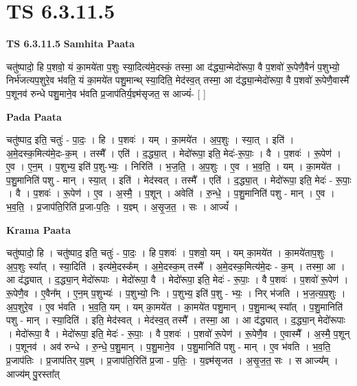 \documentclass[17pt]{extarticle}
\begin{document}
\section{ TS 6.3.11.5 }

\textbf{TS 6.3.11.5 } \newline
\textbf{Samhita Paata} \newline

चतु॑ष्पादो॒ हि प॒शवो॒ यं का॒मये॑ता प॒शुः स्या॒दित्य॑मे॒दस्कं॒ तस्मा॒ आ द॑द्ध्या॒न्मेदो॑रूपा॒ वै प॒शवो॑ रू॒पेणै॒वैनं॑ प॒शुभ्यो॒ निर्भ॑जत्यप॒शुरे॒व भ॑वति॒ यं का॒मये॑त पशु॒मान्थ् स्या॒दिति॒ मेद॑स्व॒त् तस्मा॒ आ द॑द्ध्या॒न्मेदो॑रूपा॒ वै प॒शवो॑ रू॒पेणै॒वास्मै॑ प॒शूनव॑ रुन्धे पशु॒माने॒व भ॑वति प्र॒जाप॑तिर्य॒ज्ञ्म॑सृजत॒ स आज्यं॑- [  ] \newline

\textbf{Pada Paata} \newline

चतु॑ष्पाद॒ इति॒ चतुः॑ - पा॒दः॒ । हि । प॒शवः॑ । यम् । का॒मये॑त । अ॒प॒शुः । स्या॒त् । इति॑ । अ॒मे॒दस्क॒मित्य॑मे॒दः-क॒म् । तस्मै᳚ । एति॑ । द॒द्ध्या॒त् । मेदो॑रूपा॒ इति॒ मेदः॑-रू॒पाः॒ । वै । प॒शवः॑ । रू॒पेण॑ । ए॒व । ए॒न॒म् । प॒शुभ्य॒ इति॑ प॒शु-भ्यः॒ । निरिति॑ । भ॒ज॒ति॒ । अ॒प॒शुः । ए॒व । भ॒व॒ति॒ । यम् । का॒मये॑त । प॒शु॒मानिति॑ पशु - मान् । स्या॒त् । इति॑ । मेद॑स्वत् । तस्मै᳚ । एति॑ । द॒द्ध्या॒त् । मेदो॑रूपा॒ इति॒ मेदः॑ - रू॒पाः॒ । वै । प॒शवः॑ । रू॒पेण॑ । ए॒व । अ॒स्मै॒ । प॒शून् । अवेति॑ । रु॒न्धे॒ । प॒शु॒मानिति॑ पशु - मान् । ए॒व । भ॒व॒ति॒ । प्र॒जाप॑ति॒रिति॑ प्र॒जा-प॒तिः॒ । य॒ज्ञ्म् । अ॒सृ॒ज॒त॒ । सः । आज्यं᳚ ।  \newline


\textbf{Krama Paata} \newline

चतु॑ष्पादो॒ हि । चतु॑ष्पाद॒ इति॒ चतुः॑ - पा॒दः॒ । हि प॒शवः॑ । प॒शवो॒ यम् । यम् का॒मये॑त । 
का॒मये॑ताप॒शुः । अ॒प॒शुः स्या᳚त् । स्या॒दिति॑ । इत्य॑मे॒दस्क᳚म् । अ॒मे॒दस्क॒म् तस्मै᳚ । अ॒मे॒दस्क॒मित्य॑मे॒दः - क॒म् । तस्मा॒ आ । आ द॑द्ध्यात् । द॒द्ध्या॒न् मेदो॑रूपाः । मेदो॑रूपा॒ वै । मेदो॑रूपा॒ इति॒ मेदः॑ - रू॒पाः॒ । वै प॒शवः॑ । प॒शवो॑ रू॒पेण॑ । रू॒पेणै॒व । ए॒वैन᳚म् । ए॒न॒म् प॒शुभ्यः॑ । प॒शुभ्यो॒ निः । प॒शुभ्य॒ इति॑ प॒शु - भ्यः॒ । निर् भ॑जति । भ॒ज॒त्य॒प॒शुः । अ॒प॒शुरे॒व । ए॒व भ॑वति । भ॒व॒ति॒ यम् । यम् का॒मये॑त । का॒मये॑त पशु॒मान् । प॒शु॒मान्थ् स्या᳚त् । प॒शु॒मानिति॑ पशु - मान् । स्या॒दिति॑ । इति॒ मेद॑स्वत् । मेद॑स्व॒त् तस्मै᳚ । तस्मा॒ आ । आ द॑द्ध्यात् । द॒द्ध्या॒न् मेदो॑रूपाः । मेदो॑रूपा॒ वै । मेदो॑रूपा॒ इति॒ मेदः॑ - रू॒पाः॒ । वै प॒शवः॑ । प॒शवो॑ रू॒पेण॑ । रू॒पेणै॒व । ए॒वास्मै᳚ । अ॒स्मै॒ प॒शून् । प॒शूनव॑ । अव॑ रुन्धे । रु॒न्धे॒ प॒शु॒मान् । प॒शु॒माने॒व । प॒शु॒मानिति॑ पशु - मान् । ए॒व भ॑वति । भ॒व॒ति॒ प्र॒जाप॑तिः । प्र॒जाप॑तिर् य॒ज्ञ्म् । प्र॒जाप॑ति॒रिति॑ प्र॒जा - प॒तिः॒ । य॒ज्ञ्म॑सृजत । अ॒सृ॒ज॒त॒ सः । स आज्य᳚म् । आज्य॑म् पु॒रस्ता᳚त् \newline
\end{document}
